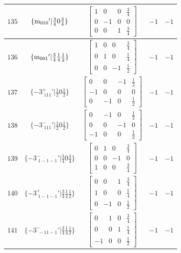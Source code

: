\documentclass[fleqn,8pt]{jsarticle}
\begin{document}
\begin{longtable}{ccccc}
$ 135 $ & $ \{{\rm m}_{010}{}'|\frac{3}{4} 0 \frac{3}{4}\} $ & $ \begin{bmatrix} 1 & 0 & 0 & \frac{3}{4} \\ 0 & -1 & 0 & 0 \\ 0 & 0 & 1 & \frac{3}{4} \end{bmatrix} $ & $ -1 $ & $ -1 $ \\ \hline
$ 136 $ & $ \{{\rm m}_{001}{}'|\frac{3}{4} \frac{1}{4} \frac{1}{2}\} $ & $ \begin{bmatrix} 1 & 0 & 0 & \frac{3}{4} \\ 0 & 1 & 0 & \frac{1}{4} \\ 0 & 0 & -1 & \frac{1}{2} \end{bmatrix} $ & $ -1 $ & $ -1 $ \\ \hline
$ 137 $ & $ \{-3^{+}_{\,\,111}{}'|\frac{1}{2} 0 \frac{1}{2}\} $ & $ \begin{bmatrix} 0 & 0 & -1 & \frac{1}{2} \\ -1 & 0 & 0 & 0 \\ 0 & -1 & 0 & \frac{1}{2} \end{bmatrix} $ & $ -1 $ & $ -1 $ \\ \hline
$ 138 $ & $ \{-3^{-}_{\,\,111}{}'|\frac{1}{2} 0 \frac{1}{2}\} $ & $ \begin{bmatrix} 0 & -1 & 0 & \frac{1}{2} \\ 0 & 0 & -1 & 0 \\ -1 & 0 & 0 & \frac{1}{2} \end{bmatrix} $ & $ -1 $ & $ -1 $ \\ \hline
$ 139 $ & $ \{-3^{-}_{\,\,1-1-1}{}'|\frac{3}{4} 0 \frac{3}{4}\} $ & $ \begin{bmatrix} 0 & 1 & 0 & \frac{3}{4} \\ 0 & 0 & -1 & 0 \\ 1 & 0 & 0 & \frac{3}{4} \end{bmatrix} $ & $ -1 $ & $ -1 $ \\ \hline
$ 140 $ & $ \{-3^{+}_{\,\,1-1-1}{}'|\frac{3}{4} \frac{1}{4} \frac{1}{2}\} $ & $ \begin{bmatrix} 0 & 0 & 1 & \frac{3}{4} \\ 1 & 0 & 0 & \frac{1}{4} \\ 0 & -1 & 0 & \frac{1}{2} \end{bmatrix} $ & $ -1 $ & $ -1 $ \\ \hline
$ 141 $ & $ \{-3^{-}_{\,\,-11-1}{}'|\frac{3}{4} \frac{1}{4} \frac{1}{2}\} $ & $ \begin{bmatrix} 0 & 1 & 0 & \frac{3}{4} \\ 0 & 0 & 1 & \frac{1}{4} \\ -1 & 0 & 0 & \frac{1}{2} \end{bmatrix} $ & $ -1 $ & $ -1 $ \\ \hline

\end{longtable}
\end{document}
